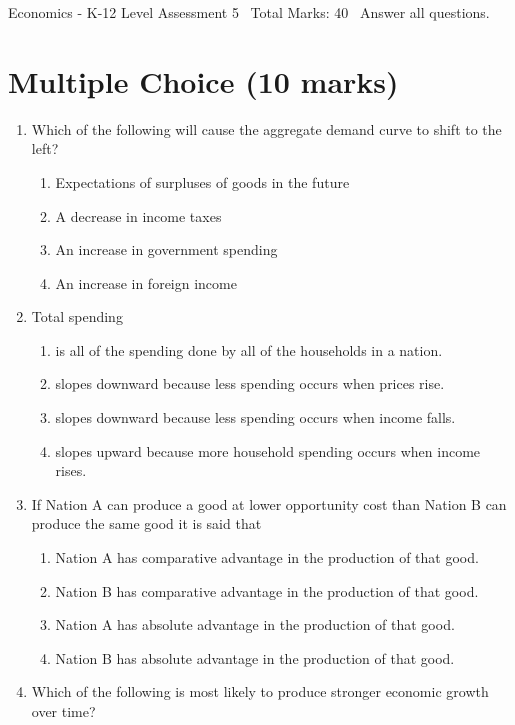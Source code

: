 \documentclass[12pt]{article}
\begin{document}
\begin{center}
Economics - K-12 Level Assessment 5 \
Total Marks: 40 \
Answer all questions.
\end{center}

\section*{Multiple Choice (10 marks)}
\begin{enumerate}[label=\arabic*.]
\item Which of the following will cause the aggregate demand curve to shift to the left?
\begin{enumerate}[label=(\alph*)]
    \item Expectations of surpluses of goods in the future
    \item A decrease in income taxes
    \item An increase in government spending
    \item An increase in foreign income
\end{enumerate}
\item Total spending
\begin{enumerate}[label=(\alph*)]
    \item is all of the spending done by all of the households in a nation.
    \item slopes downward because less spending occurs when prices rise.
    \item slopes downward because less spending occurs when income falls.
    \item slopes upward because more household spending occurs when income rises.
\end{enumerate}
\item If Nation A can produce a good at lower opportunity cost than Nation B can produce the same good it is said that
\begin{enumerate}[label=(\alph*)]
    \item Nation A has comparative advantage in the production of that good.
    \item Nation B has comparative advantage in the production of that good.
    \item Nation A has absolute advantage in the production of that good.
    \item Nation B has absolute advantage in the production of that good.
\end{enumerate}
\item Which of the following is most likely to produce stronger economic growth over time?

\end{enumerate}
\end{document}
